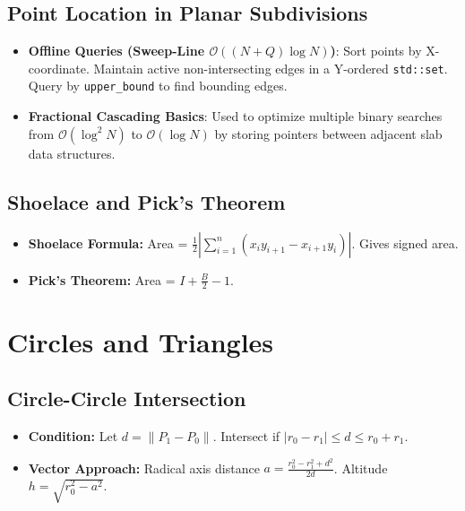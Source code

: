 \documentclass[12pt]{article}
\begin{document}
\subsection{Point Location in Planar Subdivisions}
\begin{itemize}
    \item \textbf{Offline Queries (Sweep-Line $\mathcal{O}((N+Q)\log N)$)}: Sort points by X-coordinate. Maintain active non-intersecting edges in a Y-ordered \texttt{std::set}. Query by \texttt{upper\_bound} to find bounding edges.
    \item \textbf{Fractional Cascading Basics}: Used to optimize multiple binary searches from $\mathcal{O}(\log^2 N)$ to $\mathcal{O}(\log N)$ by storing pointers between adjacent slab data structures.
\end{itemize}

\subsection{Shoelace and Pick's Theorem}
\begin{itemize}
    \item \textbf{Shoelace Formula:} Area = $\frac{1}{2} \left| \sum_{i=1}^{n} (x_i y_{i+1} - x_{i+1} y_i) \right|$. Gives signed area.
    \item \textbf{Pick's Theorem:} Area = $I + \frac{B}{2} - 1$.
\end{itemize}

\section{Circles and Triangles}

\subsection{Circle-Circle Intersection}
\begin{itemize}
    \item \textbf{Condition:} Let $d = \|P_1 - P_0\|$. Intersect if $|r_0 - r_1| \le d \le r_0 + r_1$.
    \item \textbf{Vector Approach:} Radical axis distance $a = \frac{r_0^2 - r_1^2 + d^2}{2d}$. Altitude $h = \sqrt{r_0^2 - a^2}$.
\end{itemize}

\begin{center}
\end{center}
\end{document}
